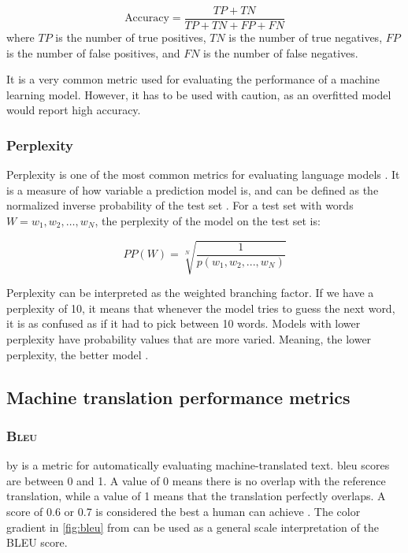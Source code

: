 \begin{equation}
    \label{eq:accuracy}
    \text{Accuracy} = \frac{TP + TN}{TP + TN + FP + FN}
\end{equation}
where \(TP\) is the number of true positives, \(TN\) is the number of true negatives, \(FP\) is the number of false positives, and \(FN\) is the number of false negatives.

It is a very common metric used for evaluating the performance of a machine learning model. However, it has to be used with caution, as an overfitted model would report high accuracy.

\subsubsection{Perplexity}
\label{sec:perplexity}
Perplexity is one of the most common metrics for evaluating language models \cite{perplexity}. It is a measure of how variable a prediction model is, and can be defined as the normalized inverse probability of the test set \cite{perplexity2}. For a test set with words \(W  = w_1, w_2, …, w_N\), the perplexity of the model on the test set is:

\begin{equation}
    \label{eq:perplexity}
    PP(W) = \sqrt[N]{\frac{1}{p(w_1,w_2,...,w_N)}}
\end{equation}

Perplexity can be interpreted as the weighted branching factor. If we have a perplexity of 10, it means that whenever the model tries to guess the next word, it is as confused as if it had to pick between 10 words. Models with lower perplexity have probability values that are more varied. Meaning, the lower perplexity, the better model \cite{perplexity2}.

\subsection{Machine translation performance metrics}
\label{sec:machine-translation-metrics}

\subsubsection{\textsc{Bleu}}
\label{sec:blue-score}
 by \textcite{papineni2002bleu} is a metric for automatically evaluating machine-translated text. \acrshort{bleu} scores are between 0 and 1. A value of 0 means there is no overlap with the reference translation, while a value of 1 means that the translation perfectly overlaps. A score of 0.6 or 0.7 is considered the best a human can achieve \cite{googlebleu,papineni2002bleu}. The color gradient in \cref{fig:bleu} from \cite{lavie2011evaluating} can be used as a general scale interpretation of the BLEU score.


